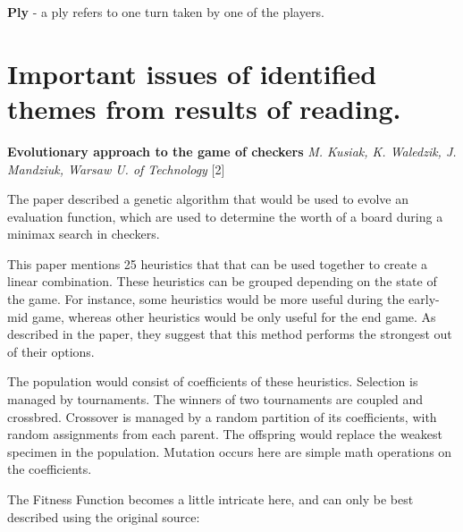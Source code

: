 \documentclass[]{article}
\begin{document}
\textbf{Ply} - a ply refers to one turn taken by one of the players.

\pagebreak

\section{Important issues of identified themes from results of
reading.}\label{important-issues-of-identified-themes-from-results-of-reading.}

\textbf{Evolutionary approach to the game of checkers} \emph{M. Kusiak,
K. Waledzik, J. Mandziuk, Warsaw U. of Technology} {[}2{]}

The paper described a genetic algorithm that would be used to evolve an 
evaluation function, which are used to determine the worth of a board 
during a minimax search in checkers.

This paper mentions 25 heuristics that that can be used together to
create a linear combination. These heuristics can be grouped depending
on the state of the game. For instance, some heuristics would be more 
useful during the early-mid game, whereas other heuristics would be only 
useful for the end game. As described in the paper, they suggest that this 
method performs the strongest out of their options. 

The population would consist of coefficients of these heuristics.
Selection is managed by tournaments. The winners of two tournaments are
coupled and crossbred. Crossover is managed by a random partition of its
coefficients, with random assignments from each parent. The offspring
would replace the weakest specimen in the population. Mutation occurs
here are simple math operations on the coefficients.

The Fitness Function becomes a little intricate here, and can only be
best described using the original source:
\end{document}
